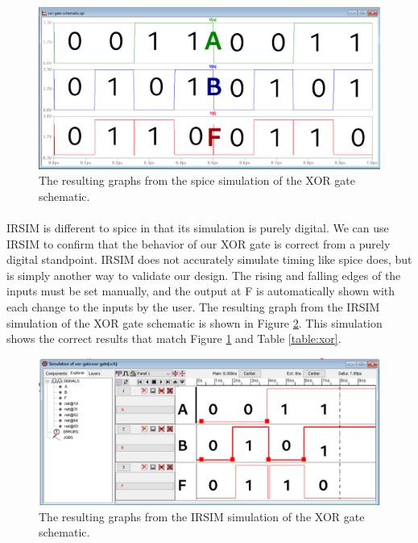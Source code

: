 \documentclass{article}
\begin{document}
  \begin{figure}[H]
    \centering
    \includegraphics[width=0.9\linewidth, frame]{screenshots/spice-sim-schematic.png}
    \caption{The resulting graphs from the spice simulation of the XOR gate schematic.}
    \label{fig:sch-sim}
  \end{figure}

  \paragraph{}
  IRSIM is different to spice in that its simulation is purely digital. We can use IRSIM to confirm that the behavior of our XOR gate is correct from a purely digital standpoint. IRSIM does not accurately simulate timing like spice does, but is simply another way to validate our design. The rising and falling edges of the inputs must be set manually, and the output at F is automatically shown with each change to the inputs by the user. The resulting graph from the IRSIM simulation of the XOR gate schematic is shown in Figure \ref{fig:irsim-sch}. This simulation shows the correct results that match Figure \ref{fig:sch-sim} and Table \ref{table:xor}.


  \begin{figure}[H]
    \centering
    \includegraphics[width=0.9\linewidth, frame]{screenshots/irsim-schematic.png}
    \caption{The resulting graphs from the IRSIM simulation of the XOR gate schematic.}
    \label{fig:irsim-sch}
  \end{figure}
\end{document}
